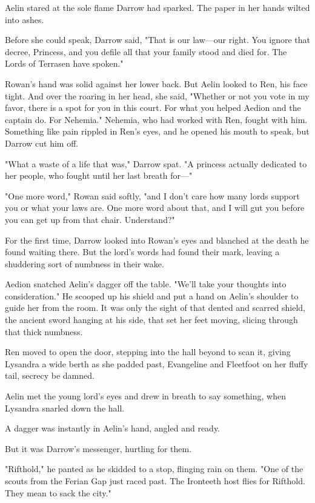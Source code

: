 Aelin stared at the sole flame Darrow had sparked. The paper in her hands wilted into ashes.

Before she could speak, Darrow said, "That is our law---our right. You ignore that decree, Princess, and you defile all that your family stood and died for. The Lords of Terrasen have spoken."

Rowan's hand was solid against her lower back. But Aelin looked to Ren, his face tight. And over the roaring in her head, she said, "Whether or not you vote in my favor, there is a spot for you in this court. For what you helped Aedion and the captain do. For Nehemia." Nehemia, who had worked with Ren, fought with him. Something like pain rippled in Ren's eyes, and he opened his mouth to speak, but Darrow cut him off.

"What a waste of a life that was," Darrow spat. "A princess actually dedicated to her people, who fought until her last breath for---"

"One more word," Rowan said softly, "and I don't care how many lords support you or what your laws are. One more word about that, and I will gut you before you can get up from that chair. Understand?"

For the first time, Darrow looked into Rowan's eyes and blanched at the death he found waiting there. But the lord's words had found their mark, leaving a shuddering sort of numbness in their wake.

Aedion snatched Aelin's dagger off the table. "We'll take your thoughts into consideration." He scooped up his shield and put a hand on Aelin's shoulder to guide her from the room. It was only the sight of that dented and scarred shield, the ancient sword hanging at his side, that set her feet moving, slicing through that thick numbness.

Ren moved to open the door, stepping into the hall beyond to scan it, giving Lysandra a wide berth as she padded past, Evangeline and Fleetfoot on her fluffy tail, secrecy be damned.

Aelin met the young lord's eyes and drew in breath to say something, when Lysandra snarled down the hall.

A dagger was instantly in Aelin's hand, angled and ready.

But it was Darrow's messenger, hurtling for them.

"Rifthold," he panted as he skidded to a stop, flinging rain on them. "One of the scouts from the Ferian Gap just raced past. The Ironteeth host flies for Rifthold. They mean to sack the city."

